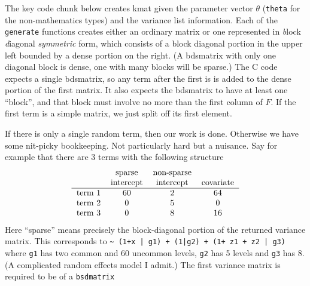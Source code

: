 \documentclass{article}
\begin{document}
The key code chunk below creates kmat given the parameter vector $\theta$
(\Verb!theta! for the non-mathematics types) and the variance list information.
Each of the \Verb!generate! functions creates either an ordinary matrix or
one represented in \emph{b}lock \emph{d}iagonal \emph{symmetric} form,
which consists of a block diagonal portion in the upper left bounded by a
dense portion on the right.
(A bdsmatrix with only one diagonal block is dense, one with many blocks
will be sparse.)
The C code expects a single bdsmatrix, so any term after the first is
is added to the dense portion of the first matrix.
It also expects the bdsmatrix to have at least one ``block'', and that
block must involve no more than the first column of $F$.
If the first term is a simple matrix, we just split off its first
element.
If there is only a single random term, then our work is done.
Otherwise we have some nit-picky bookkeeping.  Not
particularly hard but a nuisance.
Say for example that there are 3 terms with the following structure
$$\begin{tabular}{rccc}
& sparse & non-sparse \\
& intercept & intercept & covariate \\ \hline
term 1 & 60 & 2 & 64 \\
term 2 &  0 & 5 & 0 \\
term 3 &  0 & 8 & 16 \\
\end{tabular}
$$
Here ``sparse'' means precisely the block-diagonal portion of the
returned variance matrix.
This corresponds to \Verb!~ (1+x | g1) + (1|g2) + (1+ z1 + z2 | g3)!
where \Verb!g1! has two common and 60 uncommon levels, \Verb?g2? has 5
levels and \Verb!g3! has 8.
(A complicated random effects model I admit.)
The first variance matrix is required to be of a \Verb!bsdmatrix!
\end{document}
